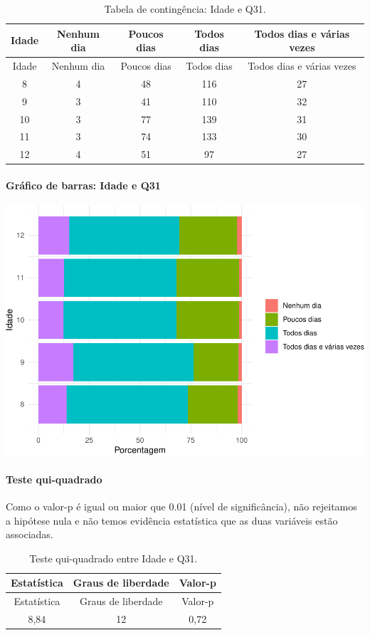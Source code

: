 \documentclass[]{article}
\let\oldparagraph\paragraph
\renewcommand{\paragraph}[1]{\oldparagraph{#1}\mbox{}}
\begin{document}
\begin{longtable}[]{@{}ccccc@{}}
\caption{\label{tab:unnamed-chunk-1035}Tabela de contingência: Idade e Q31.}\tabularnewline
\toprule
Idade & Nenhum dia & Poucos dias & Todos dias & Todos dias e várias vezes\tabularnewline
\midrule
\endfirsthead
\toprule
Idade & Nenhum dia & Poucos dias & Todos dias & Todos dias e várias vezes\tabularnewline
\midrule
\endhead
8 & 4 & 48 & 116 & 27\tabularnewline
9 & 3 & 41 & 110 & 32\tabularnewline
10 & 3 & 77 & 139 & 31\tabularnewline
11 & 3 & 74 & 133 & 30\tabularnewline
12 & 4 & 51 & 97 & 27\tabularnewline
\bottomrule
\end{longtable}

\hypertarget{gruxe1fico-de-barras-idade-e-q31}{%
\paragraph{Gráfico de barras: Idade e Q31}\label{gruxe1fico-de-barras-idade-e-q31}}

\begin{center}\includegraphics[width=0.75\linewidth]{relatorio_covid19_files/figure-latex/unnamed-chunk-1036-1} \end{center}

\hypertarget{teste-qui-quadrado-89}{%
\paragraph{Teste qui-quadrado}\label{teste-qui-quadrado-89}}

Como o valor-p é igual ou maior que 0.01 (nível de significância), não rejeitamos a hipótese nula e não temos evidência estatística que as duas variáveis estão associadas.

\begin{longtable}[]{@{}ccc@{}}
\caption{\label{tab:unnamed-chunk-1038}Teste qui-quadrado entre Idade e Q31.}\tabularnewline
\toprule
Estatística & Graus de liberdade & Valor-p\tabularnewline
\midrule
\endfirsthead
\toprule
Estatística & Graus de liberdade & Valor-p\tabularnewline
\midrule
\endhead
8,84 & 12 & 0,72\tabularnewline
\bottomrule
\end{longtable}
\end{document}
